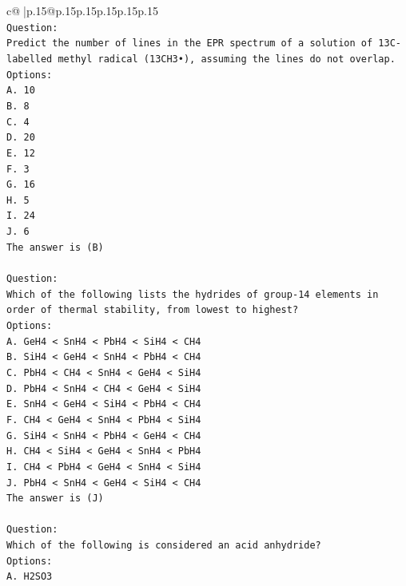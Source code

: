 \documentclass{article}
\begin{document}
{\begin{supertabular}{c@{$\;$}|p{.15\linewidth}@{}p{.15\linewidth}p{.15\linewidth}p{.15\linewidth}p{.15\linewidth}p{.15\linewidth}}
{{{\\ 
\texttt{Question:} \\
\texttt{Predict the number of lines in the EPR spectrum of a solution of 13C{-}labelled methyl radical (13CH3•), assuming the lines do not overlap.} \\
\texttt{Options:} \\
\texttt{A. 10} \\
\texttt{B. 8} \\
\texttt{C. 4} \\
\texttt{D. 20} \\
\texttt{E. 12} \\
\texttt{F. 3} \\
\texttt{G. 16} \\
\texttt{H. 5} \\
\texttt{I. 24} \\
\texttt{J. 6} \\
\texttt{The answer is (B)} \\
\\ 
\texttt{Question:} \\
\texttt{Which of the following lists the hydrides of group{-}14 elements in order of thermal stability, from lowest to highest?} \\
\texttt{Options:} \\
\texttt{A. GeH4 < SnH4 < PbH4 < SiH4 < CH4} \\
\texttt{B. SiH4 < GeH4 < SnH4 < PbH4 < CH4} \\
\texttt{C. PbH4 < CH4 < SnH4 < GeH4 < SiH4} \\
\texttt{D. PbH4 < SnH4 < CH4 < GeH4 < SiH4} \\
\texttt{E. SnH4 < GeH4 < SiH4 < PbH4 < CH4} \\
\texttt{F. CH4 < GeH4 < SnH4 < PbH4 < SiH4} \\
\texttt{G. SiH4 < SnH4 < PbH4 < GeH4 < CH4} \\
\texttt{H. CH4 < SiH4 < GeH4 < SnH4 < PbH4} \\
\texttt{I. CH4 < PbH4 < GeH4 < SnH4 < SiH4} \\
\texttt{J. PbH4 < SnH4 < GeH4 < SiH4 < CH4} \\
\texttt{The answer is (J)} \\
\\ 
\texttt{Question:} \\
\texttt{Which of the following is considered an acid anhydride?} \\
\texttt{Options:} \\
\texttt{A. H2SO3} \\
}}}
\end{supertabular}}
\end{document}
